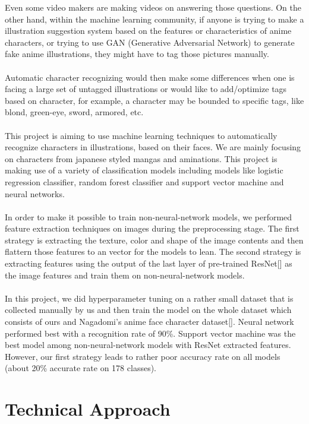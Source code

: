 \documentclass[11.5pt]{article}
\begin{document}
    Even some video makers are making videos on answering those questions.
    On the other hand, within the machine learning community, if anyone is trying to make a illustration suggestion system based on the features or characteristics of anime characters, or trying to use GAN (Generative Adversarial Network) to generate fake anime illustrations, they might have to tag those pictures manually.\\ \\
    Automatic character recognizing would then make some differences when one is facing a large set of untagged illustrations or would like to add/optimize tags based on character, for example, a character may be bounded to specific tags, like blond, green-eye, sword, armored, etc.\\ \\
    This project is aiming to use machine learning techniques to automatically recognize characters in illustrations, based on their faces. We are mainly focusing on characters from japanese styled mangas and aminations. This project is making use of a variety of classification models including models like logistic regression classifier, random forest classifier and support vector machine and neural networks.\\ \\
    In order to make it possible to train non-neural-network models, we performed feature extraction techniques on images during the preprocessing stage. The first strategy is extracting the texture, color and shape of the image contents and then flattern those features to an vector for the models to lean. The second strategy is extracting features using the output of the last layer of pre-trained ResNet[] as the image features and train them on non-neural-network models.\\ \\
    In this project, we did hyperparameter tuning on a rather small dataset that is collected manually by us and then train the model on the whole dataset which consists of ours and Nagadomi's anime face character dataset[]. Neural network performed best with a recognition rate of 90\%. Support vector machine was the best model among non-neural-network models with ResNet extracted features. However, our first strategy leads to rather poor accuracy rate on all models (about 20\% accurate rate on 178 classes).


    \section{Technical Approach}
\end{document}
